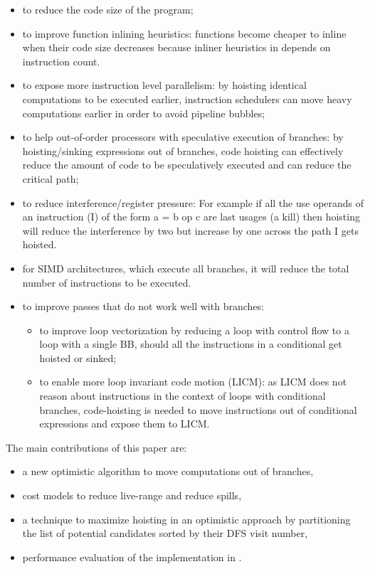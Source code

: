 \documentclass{sig-alternate}
\begin{document}
\begin{itemize}
\item to reduce the code size of the program;
\item to improve function inlining heuristics: functions become cheaper to
  inline when their code size decreases because inliner heuristics in \LLVM{}
  depends on instruction count.
\item to expose more instruction level parallelism: by hoisting identical
  computations to be executed earlier, instruction schedulers can move heavy
  computations earlier in order to avoid pipeline bubbles;
\item to help out-of-order processors with speculative execution of branches: by
  hoisting/sinking expressions out of branches, code hoisting can effectively
  reduce the amount of code to be speculatively executed and can reduce the
  critical path;
\item to reduce interference/register pressure: For example if all the use
  operands of an instruction (I) of the form a = b op c are last usages (a kill)
  then hoisting will reduce the interference by two but increase by one across
  the path I gets hoisted.
\item for SIMD architectures, which execute all branches, it will reduce the
  total number of instructions to be executed.
\item to improve passes that do not work well with branches:
  \begin{itemize}
  \item to improve loop vectorization by reducing a loop with control flow to a
    loop with a single BB, should all the instructions in a conditional get
    hoisted or sinked;
  \item to enable more loop invariant code motion (LICM): as LICM does not
    reason about instructions in the context of loops with conditional branches,
    code-hoisting is needed to move instructions out of conditional expressions
    and expose them to LICM.
  \end{itemize}
\end{itemize}

The main contributions of this paper are:
\begin{itemize}
\item a new optimistic algorithm to move computations out of branches,
\item cost models to reduce live-range and reduce spills,
\item a technique to maximize hoisting in an optimistic approach by partitioning
  the list of potential candidates sorted by their DFS visit number,
\item performance evaluation of the implementation in \LLVM{}.
\end{itemize}
\end{document}
